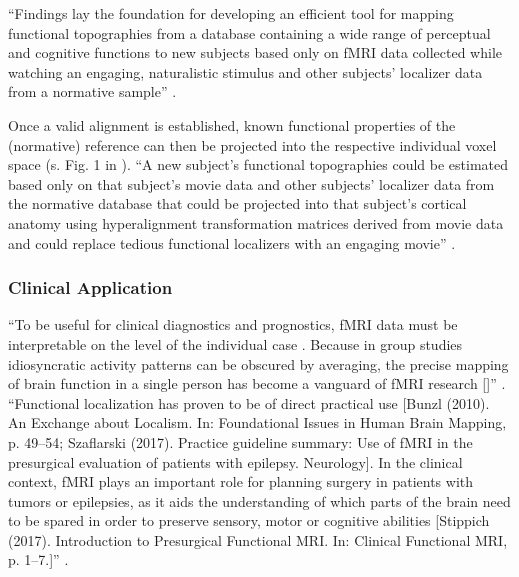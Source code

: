 %
``Findings lay the foundation for developing an efficient tool for mapping
functional topographies from a database containing a wide range of perceptual
and cognitive functions to new subjects based only on fMRI data collected while
watching an engaging, naturalistic stimulus and other subjects' localizer data
from a normative sample'' \citep{jiahui2020predicting}.

%
Once a valid alignment is established, known functional properties of the
(normative) reference can then be projected into the respective individual voxel
space (s. Fig. 1 in \citep{nishimoto2016lining}).
%
``A new subject's functional topographies could be estimated based only on that
subject's movie data and other subjects' localizer data from the normative
database that could be projected into that subject's cortical anatomy using
hyperalignment transformation matrices derived from movie data and could replace
tedious functional localizers with an engaging movie''
\citep{jiahui2020predicting}.



\subsubsection{Clinical Application}


``To be useful for clinical diagnostics and prognostics, fMRI data must be
interpretable on the level of the individual case \citep{dubois2016building}.
%
Because in group studies idiosyncratic activity patterns can be obscured by
averaging, the precise mapping of brain function in a single person has become a
vanguard of fMRI research [\citet{laumann2015functional, huth2016natural,
gordon2017precision}]'' \citep{wegrzyn2018thought}.
%
``Functional localization has proven to be of direct practical use [Bunzl
(2010). An Exchange about Localism. In: Foundational Issues in Human Brain
Mapping, p. 49–54; Szaflarski (2017). Practice guideline summary: Use of fMRI in
the presurgical evaluation of patients with epilepsy. Neurology].
%
In the clinical context, fMRI plays an important role for planning surgery in
patients with tumors or epilepsies, as it aids the understanding of which parts
of the brain need to be spared in order to preserve sensory, motor or cognitive
abilities [Stippich (2017). Introduction to Presurgical Functional MRI. In:
Clinical Functional MRI, p. 1–7.]'' \citep{wegrzyn2018thought}.





